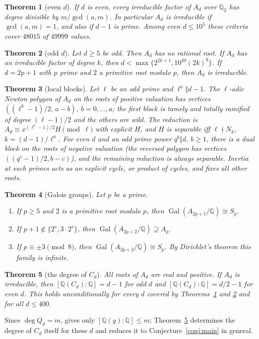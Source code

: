 \documentclass[11pt]{amsart}
\newtheorem{theoremA}{Theorem}\renewcommand{\thetheoremA}{\Alph{theoremA}}
\theoremstyle{definition}\newtheorem{definition}[theorem]{Definition}\newtheorem{example}[theorem]{Example}
\theoremstyle{remark}\newtheorem{remark}[theorem]{Remark}
\newcommand{\Q}{\mathbb Q}\newcommand{\Z}{\mathbb Z}\newcommand{\F}{\mathbb F}
\newcommand{\Gal}{\operatorname{Gal}}\newcommand{\disc}{\operatorname{disc}}\newcommand{\Res}{\operatorname{Res}}
\begin{document}
\begin{theoremA}[even $d$]\label{thmA}
If $d$ is even, every irreducible factor of $A_d$ over $\Q_2$ has degree divisible by $m/\gcd(a,m)$. In particular $A_d$ is irreducible if
$\gcd(a,m)=1$, and also if $d-1$ is prime. Among even $d\le10^5$ these criteria cover $48015$ of $49999$ values.
\end{theoremA}

\begin{theoremA}[odd $d$]\label{thmB}
Let $d\ge5$ be odd. Then $A_d$ has no rational root. If $A_d$ has an irreducible factor of degree $k$, then
$d<\max\{2^{2k+1},10^{30}(2k)^9\}$. If $d=2p+1$ with $p$ prime and $2$ a primitive root modulo $p$, then $A_d$ is irreducible.
\end{theoremA}

\begin{theoremA}[local blocks]\label{thmC}
Let $\ell$ be an odd prime and $\ell^a\Vert d-1$. The $\ell$-adic Newton polygon of $A_d$ on the roots of positive valuation has vertices
$((\ell^b-1)/2,\,a-b)$, $b=0,\dots,a$; the first block is tamely and totally ramified of degree $(\ell-1)/2$ and the others are wild.
The reduction is $A_d\equiv x^{(\ell^a-1)/2}H\pmod\ell$ with explicit $H$, and $H$ is separable iff $\ell\nmid N_k$, $k=(d-1)/\ell^a$.
For even $d$ and an odd prime power $q^b\Vert d$, $b\ge1$, there is a dual block on the roots of negative valuation (the reversed polygon has
vertices $((q^c-1)/2,b-c)$), and the remaining reduction is always separable. Inertia at such primes acts as an explicit cycle, or product of cycles, and fixes all other roots.
\end{theoremA}

\begin{theoremA}[Galois groups]\label{thmD}
Let $p$ be a prime.
\begin{enumerate}
\item If $p\ge5$ and $2$ is a primitive root modulo $p$, then $\Gal(A_{2p+1}/\Q)\cong S_p$.
\item If $p+1\notin\{2^s,3\cdot2^s\}$, then $\Gal(A_{2p+2}/\Q)\supseteq A_p$.
\item If $p\equiv\pm3\pmod8$, then $\Gal(A_{2p+2}/\Q)\cong S_p$. By Dirichlet's theorem this family is infinite.
\end{enumerate}
\end{theoremA}

\begin{theoremA}[the degree of $C_d$]\label{thmE}
All roots of $A_d$ are real and positive. If $A_d$ is irreducible, then $[\Q(C_d):\Q]=d-1$ for odd $d$ and $[\Q(C_d):\Q]=d/2-1$ for even $d$.
This holds unconditionally for every $d$ covered by Theorems~\ref{thmA} and \ref{thmB} and for all $d\le400$.
\end{theoremA}
Since $\deg Q_d=m$, \cite[Prop.~5.2]{I} gives only $[\Q(y):\Q]\le m$; Theorem~\ref{thmE} determines the degree of $C_d$ itself for these $d$ and reduces it
to Conjecture~\ref{conj:main} in general.
\end{document}
